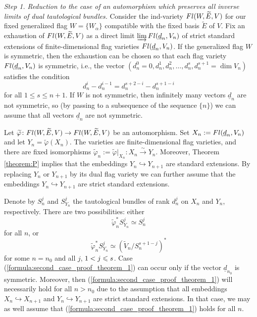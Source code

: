 \documentclass[11pt, a4paper]{article}
\begin{document}
\emph{Step 1. Reduction to the case of an automorphism which preserves all inverse limits of dual tautological bundles.} Consider the ind-variety $Fl(W,\widetilde{E},V)$ for our fixed generalized flag $W=\{ W_{\alpha}\}$ compatible with the fixed basis $\widetilde{E}$ of $V$. Fix an exhaustion of $Fl(W,\widetilde{E},V)$ as a direct limit $\varinjlim Fl(\underline{d}_{n},V_{n})$ of strict standard extensions of finite-dimensional flag varieties $Fl(\underline{d}_{n},V_{n})$. If the generalized flag $W$ is symmetric, then the exhaustion can be chosen so that each flag variety $Fl(\underline{d}_{n},V_{n})$ is symmetric, i.e., the vector $(d_n^0=0,d^1_{n},d^2_{n},\ldots,d^s_{n},d_n^{s+1}=\dim V_{n})$ satisfies the condition $$d^i_{n}-d^{i-1}_{n}=d^{s+2-i}_{n}-d^{s+1-i}_{n}$$ for all $1\leq s\leq n+1$. If $W$ is not symmetric, then infinitely many vectors $\underline{d}_{n}$ are not symmetric, so (by passing to a subsequence of the sequence $\{n\}$) we can assume that all vectors $\underline{d}_{n}$ are not symmetric. 

Let $\widetilde{\varphi}\colon Fl(W,\widetilde{E},V) \rightarrow Fl(W,\widetilde{E},V)$ be an automorphism. Set $X_n:=Fl(\underline{d}_{n},V_{n})$ and let $Y_n=\widetilde{\varphi}(X_n)$. The varieties are finite-dimensional flag varieties, and there are fixed isomorphisms $\widetilde{\varphi}_n:=\widetilde{\varphi}|_{X_n}\colon X_n \stackrel{\sim}{\rightarrow} Y_n$. Moreover, Theorem \ref{theorem:P} implies that %
the embeddings $Y_n\hookrightarrow Y_{n+1}$ are standard extensions. By replacing $Y_n$ or $Y_{n+1}$ by its dual flag variety we can further assume that the embeddings $Y_n\hookrightarrow Y_{n+1}$ are strict standard extensions. 

Denote by $S^j_n$ and $S^j_{Y_n}$ the tautological bundles of rank $d^j_n$ on $X_n$ and $Y_n$, respectively. There are two possibilities: either
\begin{equation}\label{formula:first_case_proof_theorem_1}
    \widetilde{\varphi}^*_n S^j_{Y_n} \simeq S^j_n
\end{equation}
for all $n$, or
\begin{equation}\label{formula:second_case_proof_theorem_1}
    \widetilde{\varphi}^*_n S^j_{Y_n}  \simeq (\widetilde{V}_n/S^{s+1-j}_n)^*
\end{equation}
for some $n=n_0$ and all $j$, $1<j\leqslant s$. Case (\ref{formula:second_case_proof_theorem_1}) can occur only if the vector $\underline{d}_{n_0}$ is symmetric. Moreover, then (\ref{formula:second_case_proof_theorem_1}) will necessarily hold for all $n>n_0$ due to the assumption that all embeddings $X_{n}\hookrightarrow X_{n+1}$ and $Y_{n}\hookrightarrow Y_{n+1}$ are strict standard extensions. In that case, we may as well assume that (\ref{formula:second_case_proof_theorem_1}) holds for all $n$.
\end{document}
